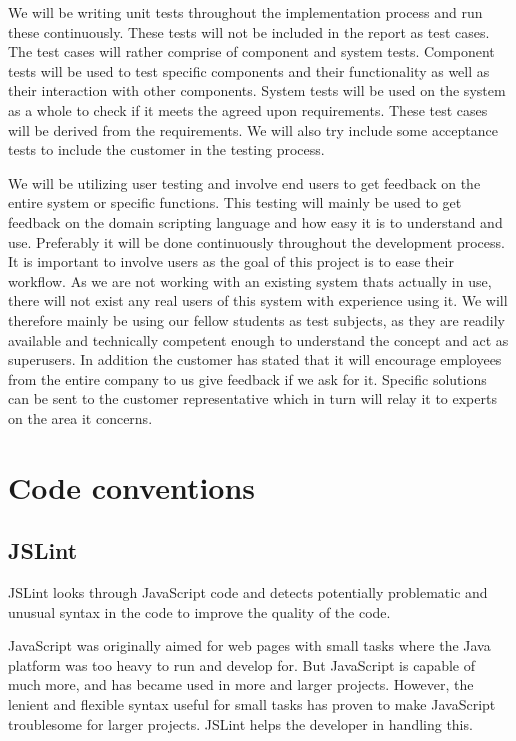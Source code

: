 We will be writing unit tests throughout the implementation process and run these continuously. These tests will not be included in the report as test cases. The test cases will rather comprise of component and system tests. Component tests will be used to test specific components and their functionality as well as their interaction with other components. System tests will be used on the system as a whole to check if it meets the agreed upon requirements. These test cases will be derived from the requirements. We will also try include some acceptance tests to include the customer in the testing process. 

We will be utilizing user testing and involve end users to get feedback on the entire system or specific functions. This testing will mainly be used to get feedback on the domain scripting language and how easy it is to understand and use. Preferably it will be done continuously throughout the development process. It is important to involve users as the goal of this project is to ease their workflow. As we are not working with an existing system thats actually in use, there will not exist any real users of this system with experience using it. We will therefore mainly be using our fellow students as test subjects, as they are readily available and technically competent enough to understand the concept and act as superusers. In addition the customer has stated that it will encourage employees from the entire company to us give feedback if we ask for it. Specific solutions can be sent to the customer representative which in turn will relay it to experts on the area it concerns.

\section{Code conventions}
\subsection*{JSLint}
JSLint looks through JavaScript code and detects potentially problematic and unusual syntax in the code to improve the quality of the code. 

JavaScript was originally aimed for web pages with small tasks where the Java platform was too heavy to run and develop for. But JavaScript is capable of much more, and has became used in more and larger projects. However, the lenient and flexible syntax useful for small tasks has proven to make JavaScript troublesome for larger projects. JSLint helps the developer in handling this. \cite{jslint-about}

